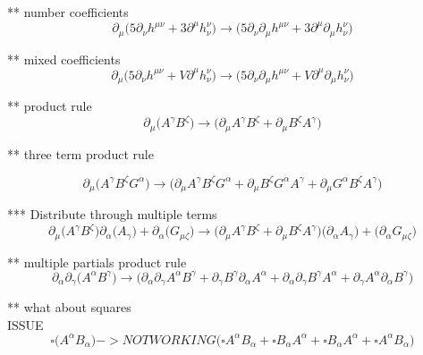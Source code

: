 \documentclass{article}
\def\){\Big)}
\def\({\Big(}
\begin{document}
** number coefficients
\begin{equation}
\partial_{\mu} \(5 \partial_{\nu}h^{\mu \nu} + 3 \partial^{\mu} h^{\nu }_{\nu}\)  \rightarrow  \(5 \partial_{\nu}\partial_{\mu}h^{\mu \nu} +3 \partial^{\mu}\partial_{\mu}h_{\nu}^{\nu} \)
\end{equation}

** mixed coefficients
\begin{equation}
\partial_{\mu} \(5 \partial_{\nu}h^{\mu \nu} + V \partial^{\mu} h^{\nu }_{\nu}\) \rightarrow \(5 \partial_{\nu}\partial_{\mu}h^{\mu \nu} +V \partial^{\mu}\partial_{\mu}h_{\nu}^{\nu} \)
\end{equation}

** product rule
\begin{equation}
\partial_{\mu} \( A^{\gamma}B^{\zeta}\) \rightarrow
 \( \partial_{\mu}A^{\gamma} B^{\zeta} + \partial_{\mu}B^{\zeta} A^{\gamma} \)
\end{equation}

** three term product rule

\begin{equation}
\partial_{\mu} \( A^{\gamma}B^{\zeta}G^{\alpha}\) \rightarrow
\( \partial_{\mu}A^{\gamma} B^{\zeta} G^{\alpha} + \partial_{\mu}B^{\zeta} G^{\alpha} A^{\gamma} + \partial_{\mu}G^{\alpha} B^{\zeta} A^{\gamma} \)
\end{equation}

*** Distribute through multiple terms
\begin{equation}
\partial_{\mu} \( A^{\gamma}B^{\zeta}\) \partial_{\alpha}\(A_{\gamma}\) + \partial_{\alpha}\(G_{\mu \zeta}\) \rightarrow
\( \partial_{\mu}A^{\gamma} B^{\zeta} + \partial_{\mu}B^{\zeta} A^{\gamma} \)\( \partial_{\alpha}A_{\gamma} \)+\( \partial_{\alpha}G_{\mu \zeta} \)
\end{equation}

** multiple partials product rule
\begin{equation}
\partial_{\alpha}\partial_{\gamma} \( A^{\alpha} B^{\gamma}\) \rightarrow
 \( \partial_{\alpha}\partial_{\gamma}A^{\alpha} B^{\gamma} + \partial_{\gamma}B^{\gamma} \partial_{\alpha}A^{\alpha} + \partial_{\alpha}\partial_{\gamma}B^{\gamma} A^{\alpha} + \partial_{\gamma}A^{\alpha} \partial_{\alpha}B^{\gamma} \)
\end{equation}

** what about squares\\

ISSUE
{\color{red}
\begin{equation}
\square \(A^{\alpha}B_{\alpha}\) -> NOT WORKING
\( \square A^{\alpha} B_{\alpha} + \square B_{\alpha} A^{\alpha} + \square B_{\alpha} A^{\alpha} + \square A^{\alpha} B_{\alpha} \)
\end{equation}
}
\end{document}
